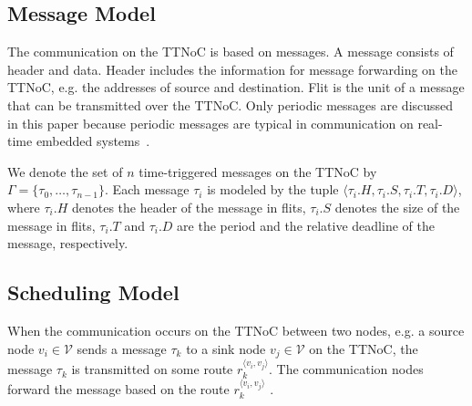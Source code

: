 \documentclass[journal]{IEEEtran}
\newcommand{\calV}{\mathcal{V}}
\newcommand{\route}[3]{#1^{\langle #2,#3\rangle}}
\theoremstyle{remark}
\begin{document}


\subsection{Message Model}

The communication on the TTNoC is based on messages.  
A message consists of header and data.  
Header includes the information for message forwarding on the TTNoC,
 e.g. the addresses of source and destination. 
Flit is the unit of a message that can be transmitted over the TTNoC.  
Only periodic messages are discussed in this paper because periodic messages are typical in communication on real-time embedded systems~\cite{DBLP:conf/date/HuangBRBK12}.

We denote the set of $n$ time-triggered messages on the TTNoC by $\Gamma = \{\tau_{0},\dots,\tau_{n-1}\}$. 
Each message $\tau_{i}$ is modeled by the tuple $\langle \tau_{i}.H,\tau_{i}.S, \tau_{i}.T,\tau_{i}.D\rangle$, 
 where $\tau_{i}.H$ denotes the header of the message in flits,
 $\tau_{i}.S$ denotes the size of the message in flits, 
 $\tau_{i}.T$ and $\tau_{i}.D$ are the period and the relative deadline of the message, respectively.
 
\subsection{Scheduling Model}
\label{ss:schmodel}

When the communication occurs on the TTNoC between two nodes,
 e.g. a source node $v_i\in \calV$ sends a message $\tau_{k}$ to a sink node $v_j\in \calV$ on the TTNoC,
  the message $\tau_k$ is transmitted on some route $\route{r_k}{v_i}{v_j}$. 
The communication nodes forward the message based on the route $\route{r_k}{v_i}{v_j}$ .
\end{document}
